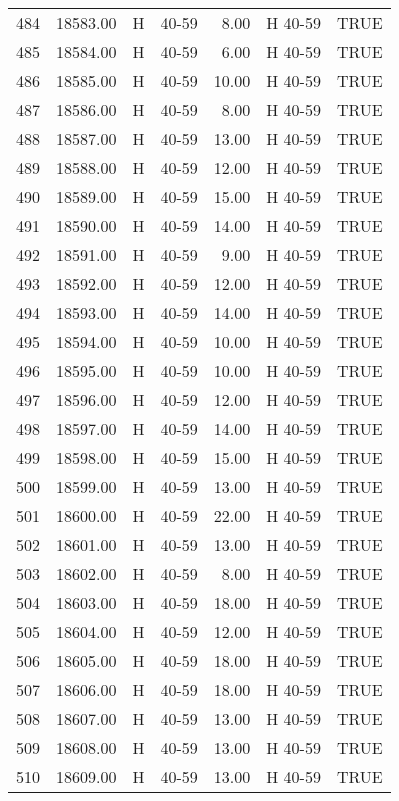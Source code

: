 \begin{table}[ht]
\begin{tabular}{rrllrll}
  484 & 18583.00 & H & 40-59 & 8.00 & H 40-59 & TRUE \\ 
  485 & 18584.00 & H & 40-59 & 6.00 & H 40-59 & TRUE \\ 
  486 & 18585.00 & H & 40-59 & 10.00 & H 40-59 & TRUE \\ 
  487 & 18586.00 & H & 40-59 & 8.00 & H 40-59 & TRUE \\ 
  488 & 18587.00 & H & 40-59 & 13.00 & H 40-59 & TRUE \\ 
  489 & 18588.00 & H & 40-59 & 12.00 & H 40-59 & TRUE \\ 
  490 & 18589.00 & H & 40-59 & 15.00 & H 40-59 & TRUE \\ 
  491 & 18590.00 & H & 40-59 & 14.00 & H 40-59 & TRUE \\ 
  492 & 18591.00 & H & 40-59 & 9.00 & H 40-59 & TRUE \\ 
  493 & 18592.00 & H & 40-59 & 12.00 & H 40-59 & TRUE \\ 
  494 & 18593.00 & H & 40-59 & 14.00 & H 40-59 & TRUE \\ 
  495 & 18594.00 & H & 40-59 & 10.00 & H 40-59 & TRUE \\ 
  496 & 18595.00 & H & 40-59 & 10.00 & H 40-59 & TRUE \\ 
  497 & 18596.00 & H & 40-59 & 12.00 & H 40-59 & TRUE \\ 
  498 & 18597.00 & H & 40-59 & 14.00 & H 40-59 & TRUE \\ 
  499 & 18598.00 & H & 40-59 & 15.00 & H 40-59 & TRUE \\ 
  500 & 18599.00 & H & 40-59 & 13.00 & H 40-59 & TRUE \\ 
  501 & 18600.00 & H & 40-59 & 22.00 & H 40-59 & TRUE \\ 
  502 & 18601.00 & H & 40-59 & 13.00 & H 40-59 & TRUE \\ 
  503 & 18602.00 & H & 40-59 & 8.00 & H 40-59 & TRUE \\ 
  504 & 18603.00 & H & 40-59 & 18.00 & H 40-59 & TRUE \\ 
  505 & 18604.00 & H & 40-59 & 12.00 & H 40-59 & TRUE \\ 
  506 & 18605.00 & H & 40-59 & 18.00 & H 40-59 & TRUE \\ 
  507 & 18606.00 & H & 40-59 & 18.00 & H 40-59 & TRUE \\ 
  508 & 18607.00 & H & 40-59 & 13.00 & H 40-59 & TRUE \\ 
  509 & 18608.00 & H & 40-59 & 13.00 & H 40-59 & TRUE \\ 
  510 & 18609.00 & H & 40-59 & 13.00 & H 40-59 & TRUE \\ 

\end{tabular}
\end{table}
